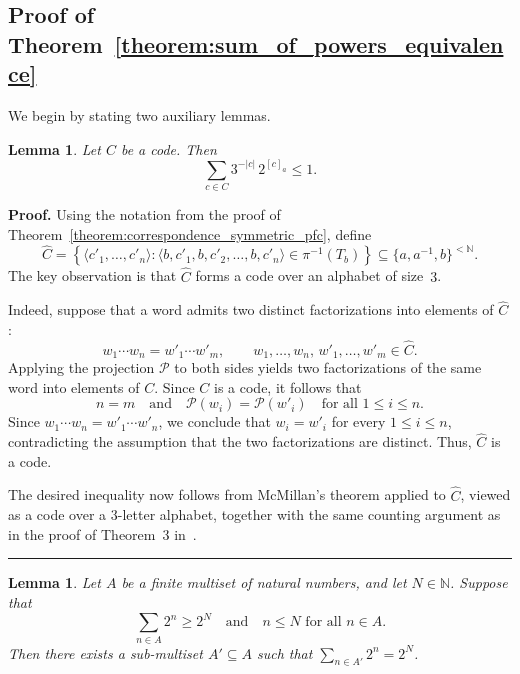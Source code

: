 \documentclass[a4,12pt]{article}%
\newtheorem{lemma}[theorem]{Lemma}
\newenvironment{proof}[1][Proof]{\textbf{#1.} }{\ \rule{0.5em}{0.5em}}
\begin{document}
\subsection{Proof of Theorem~\ref{theorem:sum_of_powers_equivalence}}
We begin by stating two auxiliary lemmas.

\begin{lemma}\label{lemma:mcmillan_3ary}
Let $C$ be a code. Then
\[
\sum_{c \in C} 3^{-\lvert c \rvert}\, 2^{[c]_a} \le 1.
\]
\end{lemma}

\begin{proof}
Using the notation from the proof of Theorem~\ref{theorem:correspondence_symmetric_pfc}, define
\[
\hat{C}
=
\left\{
\langle c'_1, \dots, c'_n \rangle :
\langle b, c'_1, b, c'_2, \dots, b, c'_n \rangle \in \pi^{-1}(T_b)
\right\}
\subseteq \{a,a^{-1},b\}^{<\mathbb{N}}.
\]
The key observation is that $\hat{C}$ forms a code over an alphabet of size~$3$.

\medskip

Indeed, suppose that a word admits two distinct factorizations into elements of $\hat{C}$:
\[
w_1 \cdots w_n = w'_1 \cdots w'_m,
\qquad
w_1,\dots,w_n,\, w'_1,\dots,w'_m \in \hat{C}.
\]
Applying the projection $\mathcal{P}$ to both sides yields two factorizations of the same word into elements of $C$. Since $C$ is a code, it follows that
\[
n = m
\quad \text{and} \quad
\mathcal{P}(w_i) = \mathcal{P}(w'_i)
\quad \text{for all } 1 \le i \le n.
\]
Since $w_1 \cdots w_n = w'_1 \cdots w'_n$,
we conclude that $w_i = w'_i$ for every $1 \le i \le n$, contradicting the assumption that the two factorizations are distinct. Thus, $\hat{C}$ is a code.

\medskip

The desired inequality now follows from McMillan's theorem applied to $\hat{C}$, viewed as a code over a $3$-letter alphabet, together with the same counting argument as in the proof of Theorem~3 in~\cite{PrefixCodesandFreeGroups}.
\end{proof}

\begin{lemma}\label{lemma:subset-sum-exact}
Let $A$ be a finite multiset of natural numbers, and let $N \in \mathbb{N}$. Suppose that 
\[
\sum_{n \in A} 2^n \ge 2^N \quad \text{and} \quad n \le N \text{ for all } n \in A.
\] 
Then there exists a sub-multiset $A' \subseteq A$ such that $\sum_{n \in A'} 2^n = 2^N$.
\end{lemma}
\end{document}
